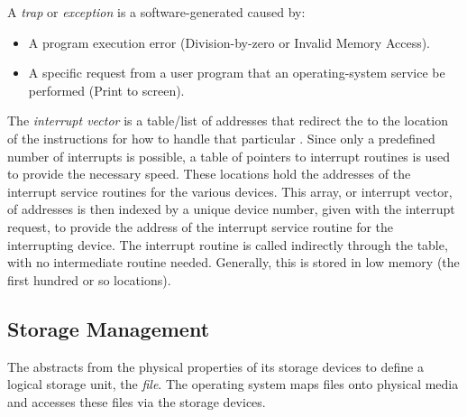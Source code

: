 \begin{definition}[Trap]\label{def:Trap}
  A \emph{trap} or \emph{exception} is a software-generated  caused by:
  \begin{itemize}[noitemsep]
  \item A program execution error (Division-by-zero or Invalid Memory Access).
  \item A specific request from a user program that an operating-system service be performed (Print to screen).
  \end{itemize}
\end{definition}

\begin{definition}\label{def:Interrupt_Vector}
  The \emph{interrupt vector} is a table/list of addresses that redirect the  to the location of the instructions for how to handle that particular .
  Since only a predefined number of interrupts is possible, a table of pointers to interrupt routines is used to provide the necessary speed.
  These locations hold the addresses of the interrupt service routines for the various devices.
  This array, or interrupt vector, of addresses is then indexed by a unique device number, given with the interrupt request, to provide the address of the interrupt service routine for the interrupting device.
  The interrupt routine is called indirectly through the table, with no intermediate routine needed.
  Generally, this is stored in low memory (the first hundred or so locations).
\end{definition}

\subsection{Storage Management}\label{subsec:Storage_Management}
\begin{definition}[File]\label{def:File}
  The  abstracts from the physical properties of its storage devices to define a logical storage unit, the \emph{file}.
  The operating system maps files onto physical media and accesses these files via the storage devices.
\end{definition}











